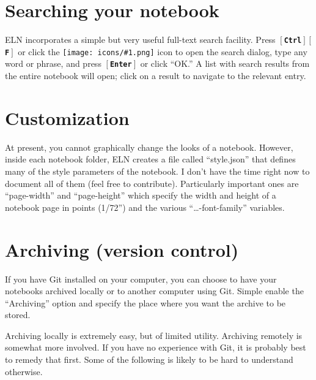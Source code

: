 \documentclass[11pt]{report}
\def\keystroke#1{$\left[\right.\!${\tt\bfseries #1}$\!\left.\right]$}
\def\key#1{\keystroke{#1}}
\def\keycombo#1#2{\keystroke{#1}\keystroke{#2}}
\def\keycontrol#1{\keycombo{Ctrl}{#1}}
\def\icon#1{\raise-2pt\hbox{\texttt{[image: icons/\#1.png]}}}
\begin{document}
\section{Searching your notebook}

ELN incorporates a simple but very useful full-text search
facility. Press \keycontrol{F} or click the \icon{nav-find} icon to open the
search dialog, type any word or phrase, and press \key{Enter} or click
``OK.'' A list with search results from the entire notebook will open;
click on a result to navigate to the relevant entry.

\section{Customization}

At present, you cannot graphically change the looks of a
notebook. However, inside each notebook folder, ELN creates a file
called ``style.json'' that defines many of the style parameters of the
notebook. I don't have the time right now to document all of them
(feel free to contribute). Particularly important ones are
``page-width'' and ``page-height'' which specify the width and height
of a notebook page in points (1/72'') and the various
``\ldots-font-family'' variables.

\section{Archiving (version control)}

If you have Git installed on your computer, you can choose to have
your notebooks archived locally or to another computer using
Git. Simple enable the ``Archiving'' option and specify the place
where you want the archive to be stored.

Archiving locally is extremely easy, but of limited utility. Archiving
remotely is somewhat more involved. If you have no experience with
Git, it is probably best to remedy that first. Some of the following
is likely to be hard to understand otherwise.
\end{document}
